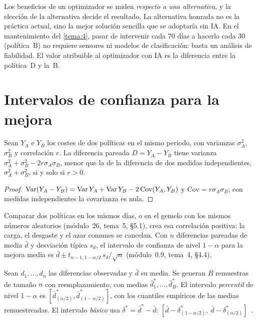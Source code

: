 Los beneficios de un optimizador se miden \emph{respecto a una alternativa}, y la elección de la alternativa decide el resultado. La alternativa honrada no es la práctica actual, sino la mejor solución sencilla que se adoptaría sin IA. En el mantenimiento del \cref{tema:4}, pasar de intervenir cada 70 días a hacerlo cada 30 (política~B) no requiere sensores ni modelos de clasificación: basta un análisis de fiabilidad. El valor atribuible al optimizador con IA es la diferencia entre la política~D y la~B.

\section{Intervalos de confianza para la mejora}

\begin{proposicion}\label{prop:pareado}
Sean $Y_A$ e $Y_B$ los costes de dos políticas en el mismo periodo, con varianzas $\sigma_A^{2}$, $\sigma_B^{2}$ y correlación $r$. La diferencia pareada $D=Y_A-Y_B$ tiene varianza $\sigma_A^{2}+\sigma_B^{2}-2r\sigma_A\sigma_B$, menor que la de la diferencia de dos medidas independientes, $\sigma_A^{2}+\sigma_B^{2}$, si y solo si $r>0$.
\end{proposicion}

\begin{proof}
$\operatorname{Var}(Y_A-Y_B)=\operatorname{Var} Y_A+\operatorname{Var} Y_B-2\,\mathrm{Cov}(Y_A,Y_B)$ y $\mathrm{Cov}=r\sigma_A\sigma_B$; con medidas independientes la covarianza es nula.
\end{proof}

Comparar dos políticas en los mismos días, o en el gemelo con los mismos números aleatorios (módulo~26, tema~5, §5.1), crea esa correlación positiva: la carga, el desgaste y el azar comunes se cancelan. Con $n$ diferencias pareadas de media $\bar d$ y desviación típica $s_d$, el intervalo de confianza de nivel $1-\alpha$ para la mejora media es $\bar d\pm t_{n-1,1-\alpha/2}\,s_d/\sqrt n$ (módulo~0.9, tema~4, §4.4).

\begin{definicion}\label{def:bootstrap}
Sean $d_1,\dots,d_n$ las diferencias observadas y $\bar d$ su media. Se generan $B$ remuestras de tamaño $n$ con reemplazamiento, con medias $\bar d^{*}_1,\dots,\bar d^{*}_B$. El intervalo \emph{percentil} de nivel $1-\alpha$ es $[\bar d^{*}_{(\alpha/2)},\bar d^{*}_{(1-\alpha/2)}]$, con los cuantiles empíricos de las medias remuestreadas. El intervalo \emph{básico} usa $\delta^{*}=\bar d^{*}-\bar d$: $[\bar d-\delta^{*}_{(1-\alpha/2)},\ \bar d-\delta^{*}_{(\alpha/2)}]$~\cite{mit1805}.
\end{definicion}

